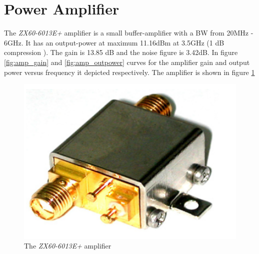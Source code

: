 \section{Power Amplifier}
The  \textit{ZX60-6013E+} amplifier is a small buffer-amplifier with a BW from 20MHz - 6GHz. It has an output-power at maximum 11.16dBm at 3.5GHz (1 dB compression ). The gain is 13.85 dB and the noise figure is 3.42dB. In figure \ref{fig:amp_gain} and \ref{fig:amp_outpower} curves for the amplifier gain and output power versus frequency it depicted respectively. The amplifier is shown in figure \ref{fig:amplifier} 

\begin{figure}[H]
\centering 
\includegraphics[scale = 0.3]{figures/measurement/amplifier.png}
\caption{The \textit{ZX60-6013E+} amplifier}
\label{fig:amplifier}
\end{figure} 

